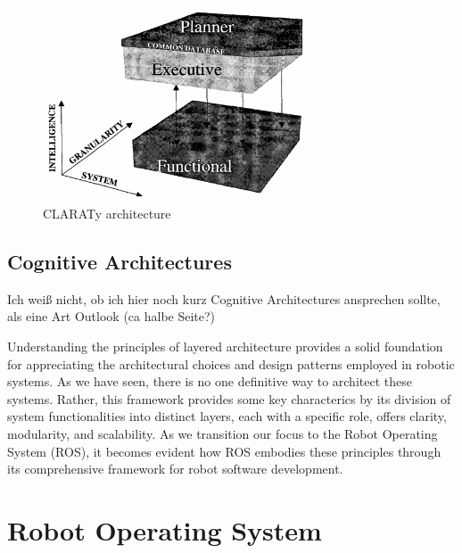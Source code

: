 \documentclass[%
paper=A4,               %
twoside=true,           %
openright,              %
11pt,                   %
bibliography=totoc,     %
titlepage=on,           %
DIV=12,                 %
BCOR=1.5cm,             %
parskip=half,            %
final
]{scrreprt}
\begin{document}
	
	\begin{figure}[ht]
		\centering
		\includegraphics[width=0.7\textwidth]{Graphics/CLARATy}
		\caption{CLARATy architecture \autocite{volpeCLARAtyArchitectureRobotic2001} }
		\label{fig: fig4}
	\end{figure} 
	
	\newpage
	
	\subsection{Cognitive Architectures}
	{\color{red} Ich weiß nicht, ob ich hier noch kurz Cognitive Architectures ansprechen sollte, als eine Art Outlook (ca halbe Seite?)}
	
	

	Understanding the principles of layered architecture provides a solid foundation for appreciating the architectural choices and design patterns employed in robotic systems. As we have seen, there is no one definitive way to architect these systems. Rather, this framework provides some key characterics by its division of system functionalities into distinct layers, each with a specific role, offers clarity, modularity, and scalability. As we transition our focus to the Robot Operating System (ROS), it becomes evident how ROS embodies these principles through its comprehensive framework for robot software development.
	
	
	
	\section{Robot Operating System}
\end{document}
